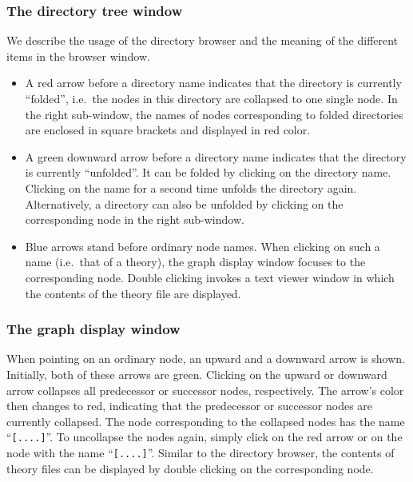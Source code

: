 \subsubsection*{The directory tree window}

We describe the usage of the directory browser and the meaning of the
different items in the browser window.
\begin{itemize}
  
\item A red arrow before a directory name indicates that the directory
  is currently ``folded'', i.e.~the nodes in this directory are
  collapsed to one single node. In the right sub-window, the names of
  nodes corresponding to folded directories are enclosed in square
  brackets and displayed in red color.
  
\item A green downward arrow before a directory name indicates that
  the directory is currently ``unfolded''. It can be folded by
  clicking on the directory name.  Clicking on the name for a second
  time unfolds the directory again.  Alternatively, a directory can
  also be unfolded by clicking on the corresponding node in the right
  sub-window.
  
\item Blue arrows stand before ordinary node names. When clicking on such a
  name (i.e.\ that of a theory), the graph display window focuses to the
  corresponding node. Double clicking invokes a text viewer window in which
  the contents of the theory file are displayed.

\end{itemize}


\subsubsection*{The graph display window}

When pointing on an ordinary node, an upward and a downward arrow is
shown.  Initially, both of these arrows are green. Clicking on the
upward or downward arrow collapses all predecessor or successor nodes,
respectively. The arrow's color then changes to red, indicating that
the predecessor or successor nodes are currently collapsed. The node
corresponding to the collapsed nodes has the name ``{\tt [....]}''. To
uncollapse the nodes again, simply click on the red arrow or on the
node with the name ``{\tt [....]}''. Similar to the directory browser,
the contents of theory files can be displayed by double clicking on
the corresponding node.


